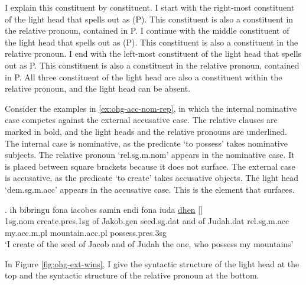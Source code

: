 I explain this constituent by constituent.
I start with the right-most constituent of the light head that spells out as  (P). This constituent is also a constituent in the relative pronoun, contained in P.
I continue with the middle constituent of the light head that spells out as  (P). This constituent is also a constituent in the relative pronoun.
I end with the left-most constituent of the light head that spells out as  {P}. This constituent is also a constituent in the relative pronoun, contained in P.
All three constituent of the light head are also a constituent within the relative pronoun, and the light head can be absent.

Consider the examples in \ref{ex:ohg-acc-nom-rep}, in which the internal nominative case competes against the external accusative case. The relative clauses are marked in bold, and the light heads and the relative pronouns are underlined.
The internal case is nominative, as the predicate  `to possess' takes nominative subjects. The relative pronoun  `\ac{rel}.\ac{sg}.\ac{m}.\ac{nom}' appears in the nominative case. It is placed between square brackets because it does not surface.
The external case is accusative, as the predicate  `to create' takes accusative objects. The light head  `\ac{dem}.\ac{sg}.\ac{m}.\ac{acc}' appears in the accusative case. This is the element that surfaces.

\exg. ih bibringu fona iacobes samin endi fona iuda \underline{dhen} [\underline{}]   \\
1\ac{sg}.\ac{nom} {create}.\ac{pres}.1\ac{sg}\scsub{[acc]} of Jakob.\ac{gen} seed.\ac{sg}.\ac{dat} and of Judah.\ac{dat} \ac{rel}.\ac{sg}.\ac{m}.\ac{acc} my.\ac{acc}.\ac{m}.\ac{pl} mountain.\ac{acc}.\ac{pl} possess.\ac{pres}.3\ac{sg}\scsub{[nom]}\\
`I create of the seed of Jacob and of Judah the one, who possess my mountains' \label{ex:ohg-acc-nom-rep}

In Figure \ref{fig:ohg-ext-wins}, I give the syntactic structure of the light head at the top and the syntactic structure of the relative pronoun at the bottom.

